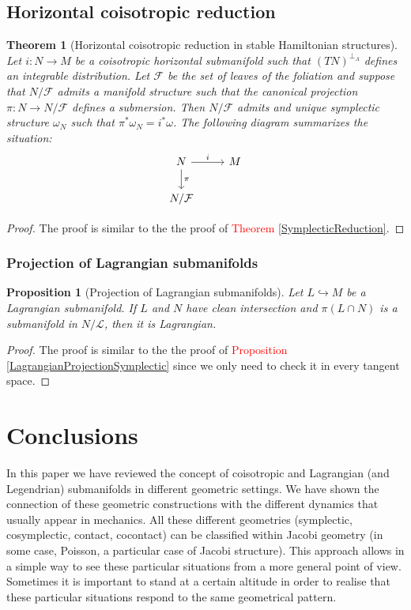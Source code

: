 \documentclass[12pt]{article}
\newtheorem{prop}{Proposition}[section]
\newtheorem{theorem}{Theorem}[section]
\newcommand{\sectiontitle}{section}
\newcommand{\setsectiontitle}[1]{\renewcommand{\sectiontitle}{\footnotesize\textit{#1}}}
\begin{document}
\subsection{Horizontal coisotropic reduction}

\begin{theorem}[Horizontal coisotropic reduction in stable Hamiltonian structures] Let $i: N \rightarrow M $ be a coisotropic horizontal submanifold such that $(TN)^{\perp_\Lambda}$ defines an integrable distribution. Let $\mathcal{F}$ be the set of leaves of the foliation and suppose that $N/\mathcal{F}$ admits a manifold structure such that the canonical projection $\pi: N \rightarrow N/\mathcal{F}$ defines a submersion. Then $N/\mathcal{F}$ admits and unique symplectic structure $\omega_N$ such that $\pi^*\omega_N = i^*\omega$. The following diagram summarizes the situation:
 \[
\begin{tikzcd} N \arrow[r, "i"] \arrow[d, "\pi"] & M \\ N / \mathcal{F} \end{tikzcd} \]
\end{theorem}
\begin{proof}  The proof is similar to the the proof of \textcolor{red}{Theorem \ref{SymplecticReduction}}.
\end{proof}

\subsubsection{Projection of Lagrangian submanifolds}
\begin{prop}[Projection of Lagrangian submanifolds] Let $L \hookrightarrow M$ be a Lagrangian submanifold. If $L$ and $N$ have clean intersection and $\pi(L \cap N)$ is a submanifold in $N/\mathcal{L}$, then it is Lagrangian.
\end{prop}
\begin{proof} The proof is similar to the the proof of \textcolor{red}{Proposition \ref{LagrangianProjectionSymplectic}} since we only need to check it in every tangent space.
\end{proof}


\section{Conclusions}
\setsectiontitle{CONCLUSIONS}
In this paper we have reviewed the concept of coisotropic and Lagrangian (and Legendrian) submanifolds in different geometric settings. We have shown the connection of these geometric constructions with the different dynamics that usually appear in mechanics. All these different geometries (symplectic, cosymplectic, contact, cocontact) can be classified within Jacobi geometry (in some case, Poisson, a particular case of Jacobi structure). This approach allows in a simple way to see these particular situations from a more general point of view. Sometimes it is important to stand at a certain altitude in order to realise that these particular situations respond to the same geometrical pattern.
\end{document}
